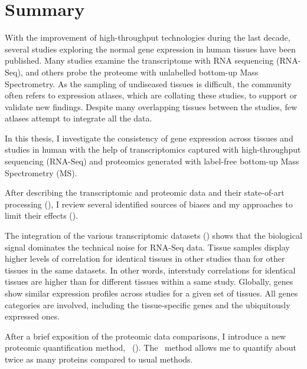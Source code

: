 \clearpage
\chapter*{Summary}\label{ch:summary}
\vspace{-1cm}
\begin{singlespace}
    {\small With the improvement of high-throughput technologies
    during the last decade,
    several studies exploring the normal gene expression in human tissues
    have been published.
    Many studies examine the transcriptome with RNA sequencing (RNA-Seq),
    and others probe the proteome with unlabelled bottom-up Mass Spectrometry.
    As the sampling of undiseased tissues is difficult,
    the community often refers to expression atlases,
    which are collating these studies,
    to support or validate new findings.
    Despite many overlapping tissues between the studies,
    few atlases attempt to integrate all the data.\mybr\

    In this thesis, I investigate the consistency of gene expression
    across tissues and studies in human
    with the help of transcriptomics
    captured with high-throughput sequencing (RNA-Seq)
    and proteomics generated with label-free bottom-up
    Mass Spectrometry (MS).\mybr\

    After describing the transcriptomic and proteomic data
    and their state-of-art processing (),
    I review several identified sources of biases
    and my approaches to limit their effects ().\mybr\

    The integration of the various transcriptomic datasets
    ()
    shows that
    the biological signal dominates the technical noise for RNA-Seq data.
    Tissue samples display higher levels of correlation
    for identical tissues in other studies than
    for other tissues in the same datasets.
    In other words, interstudy correlations for identical tissues
    are higher than for different tissues within a same study.
    Globally, genes show similar expression profiles across studies
    for a given set of tissues.
    All genes categories are involved, including the tissue-specific genes
    and the ubiquitously expressed ones.\mybr\

    After a brief exposition of the proteomic data comparisons,
    I introduce a new proteomic quantification method,
    \PPKM\ ().
    The \PPKM\ method allows me to quantify about twice as many proteins
    compared to usual methods.\mybr\

}
\end{singlespace}
